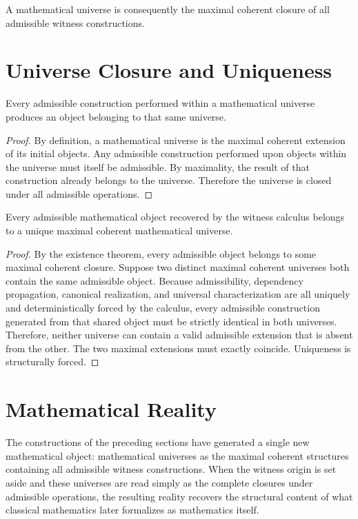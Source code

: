 \documentclass[12pt,anyside]{book}
\begin{document}
A mathematical universe is consequently the maximal coherent closure of all admissible witness constructions.

\section{Universe Closure and Uniqueness}
\begin{theorem}
Every admissible construction performed within a mathematical universe produces an object belonging to that same universe.
\end{theorem}

\begin{proof}
By definition, a mathematical universe is the maximal coherent extension of its initial objects. Any admissible construction performed upon objects within the universe must itself be admissible. By maximality, the result of that construction already belongs to the universe. Therefore the universe is closed under all admissible operations.
\end{proof}

\begin{theorem}
Every admissible mathematical object recovered by the witness calculus belongs to a unique maximal coherent mathematical universe.
\end{theorem}

\begin{proof}
By the existence theorem, every admissible object belongs to some maximal coherent closure. Suppose two distinct maximal coherent universes both contain the same admissible object. Because admissibility, dependency propagation, canonical realization, and universal characterization are all uniquely and deterministically forced by the calculus, every admissible construction generated from that shared object must be strictly identical in both universes. Therefore, neither universe can contain a valid admissible extension that is absent from the other. The two maximal extensions must exactly coincide. Uniqueness is structurally forced.
\end{proof}

\section{Mathematical Reality}
The constructions of the preceding sections have generated a single new mathematical object: mathematical universes as the maximal coherent structures containing all admissible witness constructions. When the witness origin is set aside and these universes are read simply as the complete closures under admissible operations, the resulting reality recovers the structural content of what classical mathematics later formalizes as mathematics itself.
\end{document}

